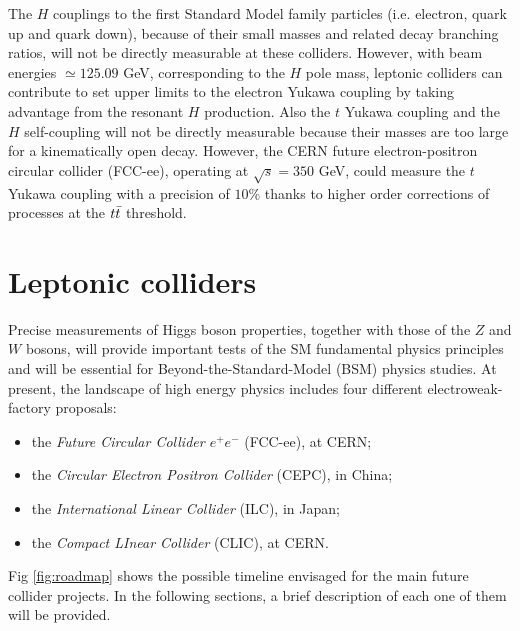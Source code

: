 The $H$ couplings to the first Standard Model family particles (i.e. electron, quark up and quark down), because of their small masses and related decay branching ratios, will not be directly measurable at these colliders. 
However, with beam energies $\simeq 125.09$ GeV, corresponding to the $H$ pole mass, leptonic colliders can contribute to set upper limits to the electron Yukawa coupling by taking advantage from the resonant $H$ production.
Also the $t$ Yukawa coupling and the $H$ self-coupling will not be directly measurable because their masses are too large for a kinematically open decay.
However, the CERN future electron-positron circular collider (FCC-ee), operating at $\sqrt{s} = 350$ GeV, could measure the $t$ Yukawa coupling with a precision of $10\%$ thanks to higher order corrections of processes at the $t\Bar{t}$ threshold.\\


\section{Leptonic colliders}\label{sec:Coll-ee}
Precise measurements of Higgs boson properties, together with those of the $Z$ and $W$ bosons, will provide important tests of the SM fundamental physics principles and will be essential for Beyond-the-Standard-Model (BSM) physics studies.
At present, the landscape of high energy physics includes four different electroweak-factory proposals:
\begin{itemize}
    \item the \textit{Future Circular Collider $e^+e^-$} (FCC-ee), at CERN;
    \item the \textit{Circular Electron Positron Collider} (CEPC), in China;
    \item the \textit{International Linear Collider} (ILC), in Japan;
    \item the \textit{Compact LInear Collider} (CLIC), at CERN.
\end{itemize}
Fig \ref{fig:roadmap} shows the possible timeline envisaged for the main future collider projects.
In the following sections, a brief description of each one of them will be provided.

